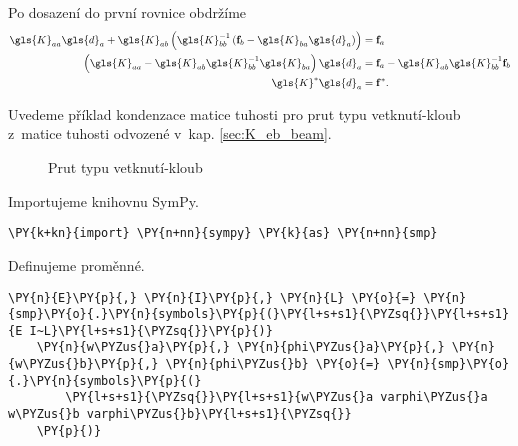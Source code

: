 Po dosazení do první rovnice obdržíme
\begin{equation} \label{eq:condensation}
    \begin{aligned}
        \gls{K}_{aa} \gls{d}_a + \gls{K}_{ab} \left(\gls{K}_{bb}^{-1} \left( \matr{f}_{b} - \gls{K}_{ba} \gls{d}_a \right)\right) &= \matr{f}_a \\
        \left(\gls{K}_{aa} - \gls{K}_{ab} \gls{K}_{bb}^{-1} \gls{K}_{ba}\right) \gls{d}_a &= \matr{f}_a - \gls{K}_{ab} \gls{K}_{bb}^{-1} \matr{f}_{b}\\
        \gls{K}^* \gls{d}_{a} &= \matr{f}^*.
    \end{aligned}
\end{equation}
 
Uvedeme příklad kondenzace matice tuhosti pro prut typu vetknutí-kloub z~matice tuhosti odvozené v~kap. \ref{sec:K_eb_beam}.

\begin{figure}[H]
    
    \caption{Prut typu vetknutí-kloub}
    \label{fig:beam_clamped}
\end{figure}


Importujeme knihovnu SymPy.
\begin{tcolorbox}[breakable, size=fbox, boxrule=1pt, pad at break*=1mm,colback=cellbackground, colframe=cellborder]
    \begin{Verbatim}[commandchars=\\\{\}]
    \PY{k+kn}{import} \PY{n+nn}{sympy} \PY{k}{as} \PY{n+nn}{smp}
    \end{Verbatim}
\end{tcolorbox}
    
Definujeme proměnné.
\begin{tcolorbox}[breakable, size=fbox, boxrule=1pt, pad at break*=1mm,colback=cellbackground, colframe=cellborder]
    \begin{Verbatim}[commandchars=\\\{\}]
    \PY{n}{E}\PY{p}{,} \PY{n}{I}\PY{p}{,} \PY{n}{L} \PY{o}{=} \PY{n}{smp}\PY{o}{.}\PY{n}{symbols}\PY{p}{(}\PY{l+s+s1}{\PYZsq{}}\PY{l+s+s1}{E I~L}\PY{l+s+s1}{\PYZsq{}}\PY{p}{)}
    \PY{n}{w\PYZus{}a}\PY{p}{,} \PY{n}{phi\PYZus{}a}\PY{p}{,} \PY{n}{w\PYZus{}b}\PY{p}{,} \PY{n}{phi\PYZus{}b} \PY{o}{=} \PY{n}{smp}\PY{o}{.}\PY{n}{symbols}\PY{p}{(}
        \PY{l+s+s1}{\PYZsq{}}\PY{l+s+s1}{w\PYZus{}a varphi\PYZus{}a w\PYZus{}b varphi\PYZus{}b}\PY{l+s+s1}{\PYZsq{}}
    \PY{p}{)}
    \end{Verbatim}
\end{tcolorbox}

